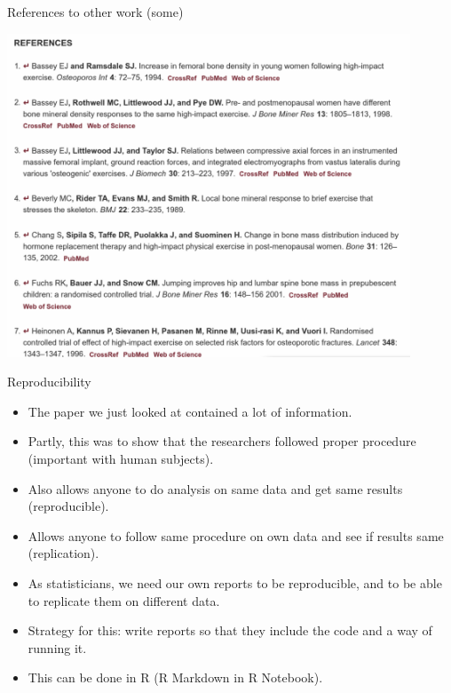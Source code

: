 \documentclass[ignorenonframetext,]{beamer}
\providecommand{\tightlist}{%
  \setlength{\itemsep}{0pt}\setlength{\parskip}{0pt}}
\begin{document}
\begin{frame}{References to other work (some)}
\protect\hypertarget{references-to-other-work-some}{}

\includegraphics[width=0.9\textwidth]{refs}

\end{frame}

\begin{frame}{Reproducibility}
\protect\hypertarget{reproducibility}{}

\begin{itemize}
\tightlist
\item
  The paper we just looked at contained a lot of information.
\item
  Partly, this was to show that the researchers followed proper
  procedure (important with human subjects).
\item
  Also allows anyone to do analysis on same data and get same results
  (reproducible).
\item
  Allows anyone to follow same procedure on own data and see if results
  same (replication).
\item
  As statisticians, we need our own reports to be reproducible, and to
  be able to replicate them on different data.
\item
  Strategy for this: write reports so that they include the code and a
  way of running it.
\item
  This can be done in R (R Markdown in R Notebook).
\end{itemize}

\end{frame}
\end{document}
